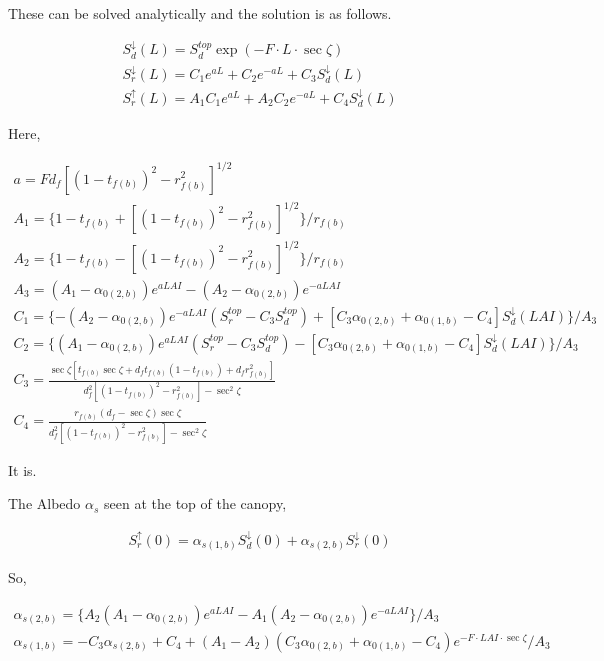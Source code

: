 These can be solved analytically and the solution is as follows.

\begin{eqnarray}
 S^{\downarrow}_d(L) = S^{top}_d \exp(-F\cdot L\cdot \sec\zeta) \\
 S^{\downarrow}_r(L) = C_1 e^{a L} + C_2 e^{-a L} + C_3 S^{\downarrow}_d(L) \\
 S^{\uparrow}_r(L)   = A_1 C_1 e^{a L} + A_2 C_2 e^{-a L} + C_4 S^{\downarrow}_d(L)
\end{eqnarray}

Here,

\begin{eqnarray}
   a = F d_f [(1-t_{f(b)})^2 - r_{f(b)}^2]^{1/2}  \\
 A_1 = \{ 1 - t_{f(b)} + [(1-t_{f(b)})^2 - r_{f(b)}^2]^{1/2}\} / r_{f(b)} \\
 A_2 = \{ 1 - t_{f(b)} - [(1-t_{f(b)})^2 - r_{f(b)}^2]^{1/2}\} / r_{f(b)} \\
 A_3 = (A_1 - \alpha_{0(2,b)}) e^{ a LAI }
        -(A_2 - \alpha_{0(2,b)}) e^{-a LAI } \\
 C_1 = \{ -(A_2 - \alpha_{0(2,b)}) e^{-a LAI} (S^{top}_r - C_3 S^{top}_d)
            +[C_3\alpha_{0(2,b)}+\alpha_{0(1,b)}-C_4]S^{\downarrow}_d(LAI)\} / A_3 \\
 C_2 = \{  (A_1 - \alpha_{0(2,b)}) e^{ a LAI} (S^{top}_r - C_3 S^{top}_d)
            -[C_3\alpha_{0(2,b)}+\alpha_{0(1,b)}-C_4]S^{\downarrow}_d(LAI)\} / A_3 \\
 C_3 = \frac{\sec\zeta[t_{f(b)}\sec\zeta + d_f t_{f(b)}(1-t_{f(b)}) + d_f r_{f(b)}^2]}
              {d_f^2[(1-t_{f(b)})^2-r_{f(b)}^2]-\sec^2\zeta} \\
 C_4 = \frac{r_{f(b)}(d_f - \sec\zeta)\sec\zeta}
              {d_f^2[(1-t_{f(b)})^2-r_{f(b)}^2]-\sec^2\zeta}
\end{eqnarray}

It is.

The Albedo \(\alpha_s\) seen at the top of the canopy,

\begin{eqnarray}
 S^{\uparrow}_r(0) = \alpha_{s(1,b)} S^{\downarrow}_d(0)
                   + \alpha_{s(2,b)} S^{\downarrow}_r(0)
\end{eqnarray}

So,

\begin{eqnarray}
 \alpha_{s(2,b)} = \{ A_2 ( A_1 - \alpha_{0(2,b)}) e^{ a LAI }
                      - A_1 ( A_2 - \alpha_{0(2,b)}) e^{-a LAI }
                   \} / A_3 \\
 \alpha_{s(1,b)} = - C_3 \alpha_{s(2,b)} + C_4
                  + ( A_1 - A_2 ) ( C_3 \alpha_{0(2,b)} + \alpha_{0(1,b)} -C_4)
                  e^{- F\cdot LAI\cdot \sec\zeta} / A_3
\end{eqnarray}

